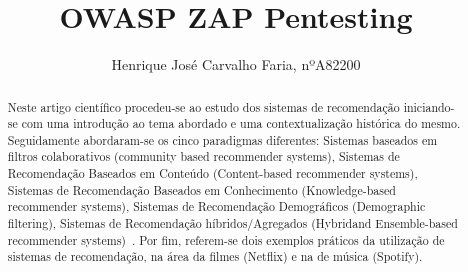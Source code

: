 %
\title{OWASP ZAP Pentesting}
%
%
\author{Henrique José Carvalho Faria, nºA82200}
%
%
%
\maketitle              %
%
\begin{abstract}
Neste artigo científico procedeu-se ao estudo dos sistemas de recomendação iniciando-se com uma introdução ao tema abordado e uma contextualização histórica do mesmo. Seguidamente abordaram-se os cinco paradigmas diferentes: Sistemas baseados em filtros colaborativos (community based recommender systems), Sistemas de Recomendação Baseados em Conteúdo (Content-based recommender systems), Sistemas de Recomendação Baseados em Conhecimento
(Knowledge-based recommender systems), Sistemas de Recomendação Demográficos (Demographic filtering), Sistemas de Recomendação híbridos/Agregados (Hybridand Ensemble-based recommender systems)~\cite{ref_book1}. Por fim, referem-se dois exemplos práticos da utilização de sistemas de recomendação, na área da filmes (Netflix) e na de música (Spotify).\newline

\end{abstract}
%
%
